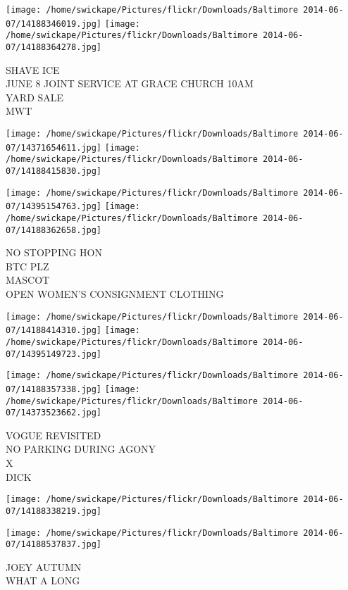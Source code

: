 \documentclass[10pt,letterpaper]{article}
\begin{document}
\texttt{[image: /home/swickape/Pictures/flickr/Downloads/Baltimore 2014-06-07/14188346019.jpg]}
\texttt{[image: /home/swickape/Pictures/flickr/Downloads/Baltimore 2014-06-07/14188364278.jpg]}

SHAVE ICE\\
JUNE 8 JOINT SERVICE AT GRACE CHURCH 10AM\\
YARD SALE\\
MWT\\
\pagebreak

\texttt{[image: /home/swickape/Pictures/flickr/Downloads/Baltimore 2014-06-07/14371654611.jpg]}
\texttt{[image: /home/swickape/Pictures/flickr/Downloads/Baltimore 2014-06-07/14188415830.jpg]}

\texttt{[image: /home/swickape/Pictures/flickr/Downloads/Baltimore 2014-06-07/14395154763.jpg]}
\texttt{[image: /home/swickape/Pictures/flickr/Downloads/Baltimore 2014-06-07/14188362658.jpg]}

NO STOPPING HON\\
BTC PLZ\\
MASCOT\\
OPEN WOMEN'S CONSIGNMENT CLOTHING\\
\pagebreak

\texttt{[image: /home/swickape/Pictures/flickr/Downloads/Baltimore 2014-06-07/14188414310.jpg]}
\texttt{[image: /home/swickape/Pictures/flickr/Downloads/Baltimore 2014-06-07/14395149723.jpg]}

\texttt{[image: /home/swickape/Pictures/flickr/Downloads/Baltimore 2014-06-07/14188357338.jpg]}
\texttt{[image: /home/swickape/Pictures/flickr/Downloads/Baltimore 2014-06-07/14373523662.jpg]}

VOGUE REVISITED\\
NO PARKING DURING AGONY\\
X\\
DICK\\
\pagebreak

\texttt{[image: /home/swickape/Pictures/flickr/Downloads/Baltimore 2014-06-07/14188338219.jpg]}

\vspace{0.25in}
\texttt{[image: /home/swickape/Pictures/flickr/Downloads/Baltimore 2014-06-07/14188537837.jpg]}

JOEY AUTUMN\\
WHAT A LONG\\
\pagebreak
\end{document}
